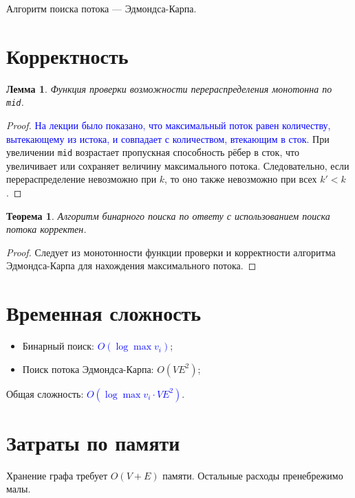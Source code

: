 \documentclass{article}
\newtheorem{lemma}{Лемма}  %
\newtheorem{theorem}{Теорема}  %
\begin{document}
Алгоритм поиска потока — Эдмондса-Карпа.

\section{Корректность}

\begin{lemma}
    Функция проверки возможности перераспределения монотонна по \texttt{mid}.
\end{lemma}

\begin{proof}
    \textcolor{blue}{На лекции было показано, что максимальный поток равен количеству, вытекающему из истока, и совпадает с количеством, втекающим в сток.}
    При увеличении \texttt{mid} возрастает пропускная способность рёбер в сток, что увеличивает или сохраняет величину максимального потока. Следовательно, если перераспределение невозможно при $k$, то оно также невозможно при всех $k' < k$.
\end{proof}

\begin{theorem}
    Алгоритм бинарного поиска по ответу с использованием поиска потока корректен.
\end{theorem}

\begin{proof}
    Следует из монотонности функции проверки и корректности алгоритма Эдмондса-Карпа для нахождения максимального потока.
\end{proof}

\section{Временная сложность}

\begin{itemize}
    \item Бинарный поиск: \textcolor{blue}{$O(\log \max{v_i})$};
    \item Поиск потока Эдмондса-Карпа: $O(VE^2)$;
\end{itemize}

Общая сложность: \textcolor{blue}{$O(\log \max{v_i} \cdot VE^2)$}.

\section{Затраты по памяти}

Хранение графа требует $O(V + E)$ памяти. Остальные расходы пренебрежимо малы.
\end{document}
